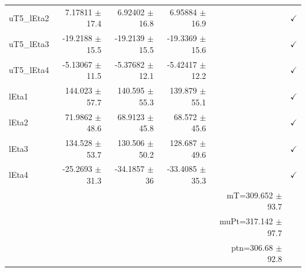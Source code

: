 \begin{table}[htbp]
\begin{tabular}{lrrrrr}
uT5\_lEta2 & 7.17811 $\pm$ 17.4 & 6.92402 $\pm$ 16.8 & 6.95884 $\pm$ 16.9 &  & $\checkmark$ \\
uT5\_lEta3 & -19.2188 $\pm$ 15.5 & -19.2139 $\pm$ 15.5 & -19.3369 $\pm$ 15.6 &  & $\checkmark$ \\
uT5\_lEta4 & -5.13067 $\pm$ 11.5 & -5.37682 $\pm$ 12.1 & -5.42417 $\pm$ 12.2 &  & $\checkmark$ \\
\hline
lEta1 & 144.023 $\pm$ 57.7 & 140.595 $\pm$ 55.3 & 139.879 $\pm$ 55.1 &  & $\checkmark$ \\
lEta2 & 71.9862 $\pm$ 48.6 & 68.9123 $\pm$ 45.8 & 68.572 $\pm$ 45.6 &  & $\checkmark$ \\
lEta3 & 134.528 $\pm$ 53.7 & 130.506 $\pm$ 50.2 & 128.687 $\pm$ 49.6 &  & $\checkmark$ \\
lEta4 & -25.2693 $\pm$ 31.3 & -34.1857 $\pm$ 36 & -33.4085 $\pm$ 35.3 &  & $\checkmark$ \\
\hline
 &  &  &  & mT=309.652 $\pm$ 93.7 &  \\
 &  &  &  & muPt=317.142 $\pm$ 97.7 &  \\
 &  &  &  & ptn=306.68 $\pm$ 92.8 &  \\
\hline
\end{tabular}
\end{table}